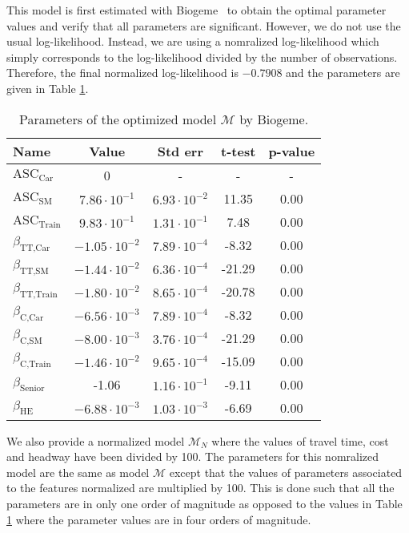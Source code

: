 \documentclass[conference]{IEEEtran}
\newcommand{\E}[1]{\cdot10^{#1}}
\begin{document}
This model is first estimated with Biogeme~\cite{bierlaire_biogeme:_2003} to obtain the optimal parameter values and verify that all parameters are significant. However, we do not use the usual log-likelihood. Instead, we are using a nomralized log-likelihood which simply corresponds to the log-likelihood divided by the number of observations. Therefore, the final normalized log-likelihood is $-0.7908$ and the parameters are given in Table \ref{tab:res_biogeme}.\\

\begin{table}
\centering
\renewcommand\arraystretch{1.2}
\begin{tabular}{l|cccc}
{\bf Name} & {\bf Value} & {\bf Std err} & {\bf t-test} & {\bf p-value} \\ \hline
$\text{ASC}_{\text{Car}}$ & 0 & - & - & - \\
$\text{ASC}_{\text{SM}}$ & $7.86\E{-1}$ & $6.93\E{-2}$ & 11.35 & 0.00 \\
$\text{ASC}_{\text{Train}}$ & $9.83\E{-1}$ & $1.31\E{-1}$ & 7.48 & 0.00 \\
$\beta_{\text{TT,Car}}$ & $-1.05\E{-2}$ & $7.89\E{-4}$ & -8.32 & 0.00 \\
$\beta_{\text{TT,SM}}$ & $-1.44\E{-2}$ & $6.36\E{-4}$ & -21.29 & 0.00 \\
$\beta_{\text{TT,Train}}$ & $-1.80\E{-2}$ & $8.65\E{-4}$ & -20.78 & 0.00 \\
$\beta_{\text{C,Car}}$ & $-6.56\E{-3}$ & $7.89\E{-4}$ & -8.32 & 0.00 \\
$\beta_{\text{C,SM}}$ & $-8.00\E{-3}$ & $3.76\E{-4}$ & -21.29 & 0.00 \\
$\beta_{\text{C,Train}}$ & $-1.46\E{-2}$ & $9.65\E{-4}$ & -15.09 & 0.00 \\
$\beta_{\text{Senior}}$ & -1.06 & $1.16\E{-1}$ & -9.11 & 0.00 \\
$\beta_{\text{HE}}$ & $-6.88\E{-3}$ & $1.03\E{-3}$ & -6.69 & 0.00
\end{tabular}
\caption{\label{tab:res_biogeme} Parameters of the optimized model $\mathcal{M}$ by Biogeme.}
\end{table}

We also provide a normalized model $\mathcal{M}_N$ where the values of travel time, cost and headway have been divided by 100. The parameters for this nomralized model are the same as model $\mathcal{M}$ except that the values of parameters associated to the features normalized are multiplied by 100. This is done such that all the parameters are in only one order of magnitude as opposed to the values in Table \ref{tab:res_biogeme} where the parameter values are in four orders of magnitude. \\
\end{document}
